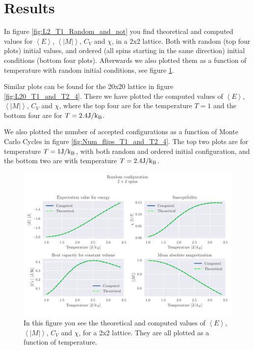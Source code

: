 \documentclass[reprint, english,notitlepage,nofootinbib]{revtex4-1}  %
\begin{document}
\section{Results}

In figure \ref{fig:L2_T1_Random_and_not} you find theoretical and computed values for $\left<E\right>$, $\left<|M|\right>$, $C_V$ and $\chi$, in a 2x2 lattice. Both with random (top four plots) initial values, and ordered (all spins starting in the same direction) initial conditions (bottom four plots). Afterwards we also plotted them as a function of temperature with random initial conditions, see figure \ref{fig:L2_Random}.

Similar plots can be found for the 20x20 lattice in figure \ref{fig:L20_T1_and_T2_4}. There we have plotted the computed values of $\left<E\right>$, $\left<|M|\right>$, $C_V$ and $\chi$, where the top four are for the temperature $T=1$ and the bottom four are for $T=2.4\rm{J}/k_B$.

We also plotted the number of accepted configurations as a function of Monte Carlo Cycles in figure \ref{fig:Num_flips_T1_and_T2_4}. The top two plots are for temperature $T=1\rm{J}/k_B$, with both random and ordered initial configuration, and the bottom two are with temperature $T=2.4\rm{J}/k_B$.

\begin{figure}[!htb]
	\includegraphics[width=\linewidth]{../output/c/L2-T1-dT0_01-NT240-N6-RandomFalse-CompTemp.pdf}
	\caption{In this figure you see the theoretical and computed values of $\left<E\right>$, $\left<|M|\right>$, $C_V$ and $\chi$, for a 2x2 lattice. They are all plotted as a function of temperature.}
	\label{fig:L2_Random}
\end{figure}
\end{document}

